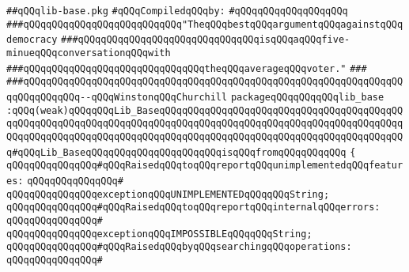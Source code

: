\label{src/lib/src/lib-base.pkg}
\verb|##qQQqlib-base.pkg|\newline
\newline
\verb|#qQQqCompiledqQQqby:|\newline
\verb|#qQQqqQQqqQQqqQQqqQQq|\newline
\newline
\verb|###qQQqqQQqqQQqqQQqqQQqqQQqqQQq"TheqQQqbestqQQqargumentqQQqagainstqQQqdemocracy|\newline
\verb|###qQQqqQQqqQQqqQQqqQQqqQQqqQQqqQQqisqQQqaqQQqfive-minueqQQqconversationqQQqwith|\newline
\verb|###qQQqqQQqqQQqqQQqqQQqqQQqqQQqqQQqtheqQQqaverageqQQqvoter."|\newline
\verb|###|\newline
\verb|###qQQqqQQqqQQqqQQqqQQqqQQqqQQqqQQqqQQqqQQqqQQqqQQqqQQqqQQqqQQqqQQqqQQqqQQqqQQqqQQq--qQQqWinstonqQQqChurchill|\newline
\newline
\newline
\newline
\verb|packageqQQqqQQqqQQqlib_base|\newline
\verb|:qQQq(weak)qQQqqQQqLib_BaseqQQqqQQqqQQqqQQqqQQqqQQqqQQqqQQqqQQqqQQqqQQqqQQqqQQqqQQqqQQqqQQqqQQqqQQqqQQqqQQqqQQqqQQqqQQqqQQqqQQqqQQqqQQqqQQqqQQqqQQqqQQqqQQqqQQqqQQqqQQqqQQqqQQqqQQqqQQqqQQqqQQqqQQqqQQqqQQqqQQqqQQq#qQQqLib_BaseqQQqqQQqqQQqqQQqqQQqqQQqisqQQqfromqQQqqQQqqQQq|\newline
\verb|{|\newline
\verb|qQQqqQQqqQQqqQQq#qQQqRaisedqQQqtoqQQqreportqQQqunimplementedqQQqfeatures:|\newline
\verb|qQQqqQQqqQQqqQQq#|\newline
\verb|qQQqqQQqqQQqqQQqexceptionqQQqUNIMPLEMENTEDqQQqqQQqString;|\newline
\newline
\verb|qQQqqQQqqQQqqQQq#qQQqRaisedqQQqtoqQQqreportqQQqinternalqQQqerrors:|\newline
\verb|qQQqqQQqqQQqqQQq#|\newline
\verb|qQQqqQQqqQQqqQQqexceptionqQQqIMPOSSIBLEqQQqqQQqString;|\newline
\newline
\verb|qQQqqQQqqQQqqQQq#qQQqRaisedqQQqbyqQQqsearchingqQQqoperations:|\newline
\verb|qQQqqQQqqQQqqQQq#|\newline
